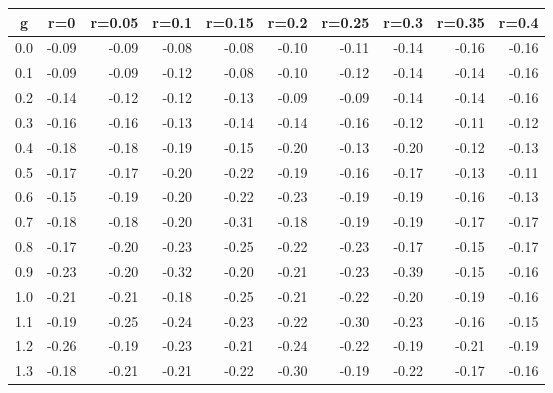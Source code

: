 %
\begin{table}[!tbp]
 \begin{center}
 \begin{tabular}{rrrrrrrrrr}\hline\hline
\multicolumn{1}{c}{g}&\multicolumn{1}{c}{r=0}&\multicolumn{1}{c}{r=0.05}&\multicolumn{1}{c}{r=0.1}&\multicolumn{1}{c}{r=0.15}&\multicolumn{1}{c}{r=0.2}&\multicolumn{1}{c}{r=0.25}&\multicolumn{1}{c}{r=0.3}&\multicolumn{1}{c}{r=0.35}&\multicolumn{1}{c}{r=0.4}\tabularnewline
\hline
0.0&-0.09&-0.09&-0.08&-0.08&-0.10&-0.11&-0.14&-0.16&-0.16\tabularnewline
0.1&-0.09&-0.09&-0.12&-0.08&-0.10&-0.12&-0.14&-0.14&-0.16\tabularnewline
0.2&-0.14&-0.12&-0.12&-0.13&-0.09&-0.09&-0.14&-0.14&-0.16\tabularnewline
0.3&-0.16&-0.16&-0.13&-0.14&-0.14&-0.16&-0.12&-0.11&-0.12\tabularnewline
0.4&-0.18&-0.18&-0.19&-0.15&-0.20&-0.13&-0.20&-0.12&-0.13\tabularnewline
0.5&-0.17&-0.17&-0.20&-0.22&-0.19&-0.16&-0.17&-0.13&-0.11\tabularnewline
0.6&-0.15&-0.19&-0.20&-0.22&-0.23&-0.19&-0.19&-0.16&-0.13\tabularnewline
0.7&-0.18&-0.18&-0.20&-0.31&-0.18&-0.19&-0.19&-0.17&-0.17\tabularnewline
0.8&-0.17&-0.20&-0.23&-0.25&-0.22&-0.23&-0.17&-0.15&-0.17\tabularnewline
0.9&-0.23&-0.20&-0.32&-0.20&-0.21&-0.23&-0.39&-0.15&-0.16\tabularnewline
1.0&-0.21&-0.21&-0.18&-0.25&-0.21&-0.22&-0.20&-0.19&-0.16\tabularnewline
1.1&-0.19&-0.25&-0.24&-0.23&-0.22&-0.30&-0.23&-0.16&-0.15\tabularnewline
1.2&-0.26&-0.19&-0.23&-0.21&-0.24&-0.22&-0.19&-0.21&-0.19\tabularnewline
1.3&-0.18&-0.21&-0.21&-0.22&-0.30&-0.19&-0.22&-0.17&-0.16\tabularnewline
\hline
\end{tabular}

\end{center}

\end{table}

